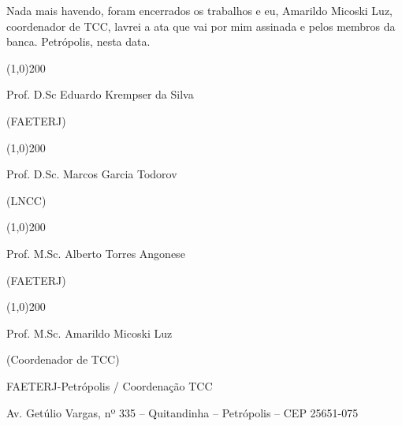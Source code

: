 \documentclass[a4paper]{report} %
\begin{document}
\noindent Nada mais havendo, foram encerrados os trabalhos e eu, Amarildo Micoski Luz, coordenador de TCC, lavrei a ata que vai por mim assinada e pelos membros da banca. Petrópolis, nesta data.

\vspace*{2cm}

\begin{center}
\line(1,0){200}


Prof. D.Sc Eduardo Krempser da Silva


(FAETERJ)


% 
\vspace*{0.5cm}
%


\line(1,0){200}


Prof. D.Sc. Marcos Garcia Todorov


(LNCC)


%
\vspace*{0.5cm}
%


\line(1,0){200}


Prof. M.Sc. Alberto Torres Angonese


(FAETERJ)


% 
\vspace*{0.5cm}
%


\line(1,0){200}


Prof. M.Sc. Amarildo Micoski Luz


(Coordenador de TCC)


% 
\vspace*{1cm}
%


FAETERJ-Petrópolis / Coordenação TCC


Av. Getúlio Vargas, nº 335 – Quitandinha – Petrópolis – CEP 25651-075 


\end{center}
\end{document}

